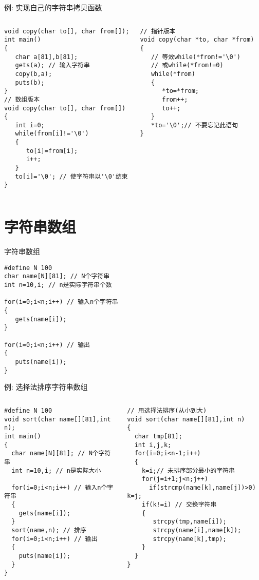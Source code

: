 \begin{frame}{例: 实现自己的字符串拷贝函数}
\vspace{-0.5cm}
\begin{columns}[T]
\begin{lstlisting}
void copy(char to[], char from[]);
int main()
{
   char a[81],b[81];
   gets(a); // 输入字符串
   copy(b,a);
   puts(b);
}
// 数组版本
void copy(char to[], char from[])
{
   int i=0;
   while(from[i]!='\0')
   {
      to[i]=from[i];
      i++;
   }
   to[i]='\0'; // 使字符串以'\0'结束
}
\end{lstlisting}
\begin{lstlisting}[frame=leftline]
// 指针版本
void copy(char *to, char *from)
{
   // 等效while(*from!='\0')
   // 或while(*from!=0)
   while(*from) 
   {
      *to=*from;
      from++;
      to++;
   }
   *to='\0';// 不要忘记此语句
}
\end{lstlisting}
\end{columns}
\medskip
\end{frame}

\section{字符串数组}

\begin{frame}{字符串数组}
\begin{lstlisting}
#define N 100
char name[N][81]; // N个字符串
int n=10,i; // n是实际字符串个数

for(i=0;i<n;i++) // 输入n个字符串
{
   gets(name[i]); 
}

for(i=0;i<n;i++) // 输出
{
   puts(name[i]);
}
\end{lstlisting}
\end{frame}

\begin{frame}{例: 选择法排序字符串数组}
\vspace{-0.5cm}
\begin{columns}[T]
\begin{lstlisting}
#define N 100
void sort(char name[][81],int n);
int main()
{
  char name[N][81]; // N个字符串
  int n=10,i; // n是实际大小

  for(i=0;i<n;i++) // 输入n个字符串
  {
    gets(name[i]); 
  }
  sort(name,n); // 排序
  for(i=0;i<n;i++) // 输出
  {
    puts(name[i]); 
  }
}
\end{lstlisting}
\begin{lstlisting}[frame=leftline]
// 用选择法排序(从小到大)
void sort(char name[][81],int n)
{
  char tmp[81];
  int i,j,k;
  for(i=0;i<n-1;i++)
  {
    k=i;// 未排序部分最小的字符串
    for(j=i+1;j<n;j++)
      if(strcmp(name[k],name[j])>0) k=j;
    if(k!=i) // 交换字符串
    {
       strcpy(tmp,name[i]); 
       strcpy(name[i],name[k]); 
       strcpy(name[k],tmp);
    }
  }
}
\end{lstlisting}
\end{columns}
~\\
\end{frame}

